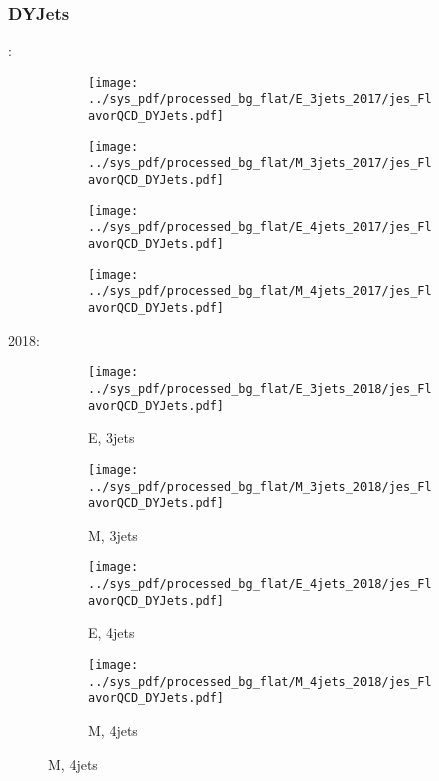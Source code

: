\documentclass{beamer}
\begin{document}
\begin{frame}
\frametitle{DYJets}
\fontsize{5}{1}:
\begin{figure}
\centering
\begin{subfigure}[b]{0.24\textwidth}
\texttt{[image: ../sys\_pdf/processed\_bg\_flat/E\_3jets\_2017/jes\_FlavorQCD\_DYJets.pdf]}
\end{subfigure}
\begin{subfigure}[b]{0.24\textwidth}
\texttt{[image: ../sys\_pdf/processed\_bg\_flat/M\_3jets\_2017/jes\_FlavorQCD\_DYJets.pdf]}
\end{subfigure}
\begin{subfigure}[b]{0.24\textwidth}
\texttt{[image: ../sys\_pdf/processed\_bg\_flat/E\_4jets\_2017/jes\_FlavorQCD\_DYJets.pdf]}
\end{subfigure}
\begin{subfigure}[b]{0.24\textwidth}
\texttt{[image: ../sys\_pdf/processed\_bg\_flat/M\_4jets\_2017/jes\_FlavorQCD\_DYJets.pdf]}
\end{subfigure}
\end{figure}
2018:
\begin{figure}
\centering
\begin{subfigure}[b]{0.24\textwidth}
\texttt{[image: ../sys\_pdf/processed\_bg\_flat/E\_3jets\_2018/jes\_FlavorQCD\_DYJets.pdf]}
\captionsetup{font=tiny}
\caption{E, 3jets}
\end{subfigure}
\begin{subfigure}[b]{0.24\textwidth}
\texttt{[image: ../sys\_pdf/processed\_bg\_flat/M\_3jets\_2018/jes\_FlavorQCD\_DYJets.pdf]}
\captionsetup{font=tiny}
\caption{M, 3jets}
\end{subfigure}
\begin{subfigure}[b]{0.24\textwidth}
\texttt{[image: ../sys\_pdf/processed\_bg\_flat/E\_4jets\_2018/jes\_FlavorQCD\_DYJets.pdf]}
\captionsetup{font=tiny}
\caption{E, 4jets}
\end{subfigure}
\begin{subfigure}[b]{0.24\textwidth}
\texttt{[image: ../sys\_pdf/processed\_bg\_flat/M\_4jets\_2018/jes\_FlavorQCD\_DYJets.pdf]}
\captionsetup{font=tiny}
\caption{M, 4jets}
\end{subfigure}
\end{figure}
\end{frame}
\end{document}
